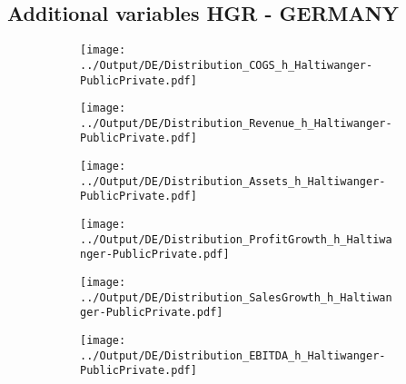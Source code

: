 \documentclass[12pt,notitlepage]{article}
\begin{document}
\subsection*{Additional variables HGR - GERMANY}
\begin{figure}[!htpb]
\centering
\begin{subfigure}{.49\textwidth}
    \centering
 \texttt{[image: ../Output/DE/Distribution\_COGS\_h\_Haltiwanger-PublicPrivate.pdf]}
\end{subfigure}%
\begin{subfigure}{.49\textwidth}
    \centering
 \texttt{[image: ../Output/DE/Distribution\_Revenue\_h\_Haltiwanger-PublicPrivate.pdf]}
\end{subfigure}
\begin{subfigure}{.49\textwidth}
    \centering
 \texttt{[image: ../Output/DE/Distribution\_Assets\_h\_Haltiwanger-PublicPrivate.pdf]}
\end{subfigure}%
\begin{subfigure}{.49\textwidth}
    \centering
 \texttt{[image: ../Output/DE/Distribution\_ProfitGrowth\_h\_Haltiwanger-PublicPrivate.pdf]}
\end{subfigure}
\begin{subfigure}{.49\textwidth}
    \centering
 \texttt{[image: ../Output/DE/Distribution\_SalesGrowth\_h\_Haltiwanger-PublicPrivate.pdf]}
\end{subfigure}
\begin{subfigure}{.49\textwidth}
    \centering
 \texttt{[image: ../Output/DE/Distribution\_EBITDA\_h\_Haltiwanger-PublicPrivate.pdf]}
\end{subfigure}
\end{figure}
\clearpage
\end{document}

